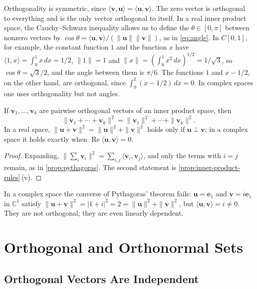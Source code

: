 Orthogonality is symmetric, since $\langle\mathbf v,\mathbf u\rangle=\overline{\langle\mathbf u,\mathbf v\rangle}$. The zero vector is orthogonal to everything and is the only vector orthogonal to itself. In a real inner product space, the Cauchy--Schwarz inequality allows us to define the  $\theta\in[0,\pi]$ between nonzero vectors by $\cos\theta=\langle\mathbf u,\mathbf v\rangle/(\|\mathbf u\|\|\mathbf v\|)$, as in \eqref{eq:angle}. In $C[0,1]$, for example, the constant function $1$ and the function $x$ have $\langle1,x\rangle=\int_0^1x\,dx=1/2$, $\|1\|=1$ and $\|x\|=(\int_0^1x^2\,dx)^{1/2}=1/\sqrt3$, so $\cos\theta=\sqrt3/2$, and the angle between them is $\pi/6$. The functions $1$ and $x-1/2$, on the other hand, are orthogonal, since $\int_0^1(x-1/2)\,dx=0$. In complex spaces one uses orthogonality but not angles.

\begin{proposition}
\label{prop:pythagoras-general}
If $\mathbf v_1,\ldots,\mathbf v_k$ are pairwise orthogonal vectors of an inner product space, then
\[
\|\mathbf v_1+\cdots+\mathbf v_k\|^2=\|\mathbf v_1\|^2+\cdots+\|\mathbf v_k\|^2 .
\]
In a real space, $\|\mathbf u+\mathbf v\|^2=\|\mathbf u\|^2+\|\mathbf v\|^2$ holds only if $\mathbf u\perp\mathbf v$; in a complex space it holds exactly when $\operatorname{Re}\langle\mathbf u,\mathbf v\rangle=0$.
\end{proposition}

\begin{proof}
Expanding, $\|\sum_i\mathbf v_i\|^2=\sum_{i,j}\langle\mathbf v_i,\mathbf v_j\rangle$, and only the terms with $i=j$ remain, as in \cref{prop:pythagoras}. The second statement is \cref{prop:inner-product-rules}\,(v).
\end{proof}

In a complex space the converse of Pythagoras' theorem fails: $\mathbf u=\mathbf e_1$ and $\mathbf v=i\mathbf e_1$ in $\mathbb C^1$ satisfy $\|\mathbf u+\mathbf v\|^2=|1+i|^2=2=\|\mathbf u\|^2+\|\mathbf v\|^2$, but $\langle\mathbf u,\mathbf v\rangle=i\ne0$. They are not orthogonal; they are even linearly dependent.

\section{Orthogonal and Orthonormal Sets}
\label{sec:orthonormal-sets}

\subsection{Orthogonal Vectors Are Independent}


